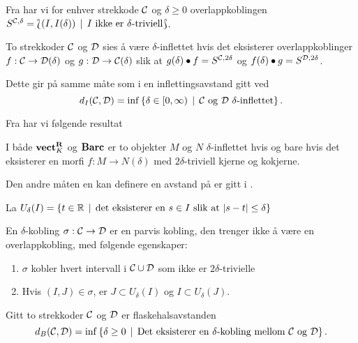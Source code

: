 Fra \cite{Bauer2020} har vi for enhver strekkode $\mathcal{C}$
og $\delta\geq0$ overlappkoblingen $S^{\mathcal{C},\delta}
= \Lbag (I,I(\delta))\,\mid\, \text{$I$ ikke er
$\delta$-triviell}\Rbag$.

\begin{definisjon}\label{def:InfBar}
To strekkoder $\mathcal{C}$ og $\mathcal{D}$ sies å være
  $\delta$-inflettet hvis det eksisterer overlappkoblinger
  $f:\mathcal{C}\to \mathcal{D}(\delta)$ og $g:\mathcal{D}\to\mathcal{C}(\delta)$
  slik at $g(\delta)\bullet f = S^{\mathcal{C},2\delta}$ og
  $f(\delta)\bullet g=S^{\mathcal{D},2\delta}$.
\end{definisjon}

Dette gir på samme måte som i  en inflettingsavstand gitt ved
\[d_I(\mathcal{C},\mathcal{D}) = \inf\left\{\delta\in[0,\infty)\,\mid\,\text{$\mathcal{C}$ og $\mathcal{D}$ $\delta$-inflettet}\right\}.\]

Fra \citep[proposisjon 4.2]{Bauer2020} har vi følgende resultat
\begin{proposisjon}\label{prop:inftriv}
  I både $\textnormal{\textbf{vect}}_K^{\textnormal{\textbf{{R}}}}$ og $\textnormal{\textbf{Barc}}$ er to objekter $M$ og $N$ $\delta$-inflettet hvis og bare hvis det eksisterer en morfi $f: M\to N(\delta)$ med $2\delta$-triviell kjerne og kokjerne.
\end{proposisjon}

Den andre måten en kan definere en avstand på er gitt
i \cite[seksjon 4.2]{Bauer2020}.

La $U_\delta(I) = \left\{t\in\mathbb{R}\,\mid\,\text{det eksisterer en $s\in I$ slik at }|s-t|\leq\delta\right\}$

\begin{definisjon}\label{def:delta-kobling}
En $\delta$-kobling $\sigma:\mathcal{C}\to \mathcal{D}$ er en parvis kobling, den trenger ikke å være en overlappkobling, med følgende egenskaper:
\begin{enumerate}
    \item $\sigma$ kobler hvert intervall i $\mathcal{C}\cup\mathcal{D}$ som ikke er $2\delta$-trivielle\\
    \item Hvis $(I,J)\in\sigma$, er $J\subset U_\delta(I)$ og $I\subset U_\delta(J)$.
\end{enumerate}
\end{definisjon}

\begin{definisjon}\label{def:FlaskAvst}
Gitt to strekkoder $\mathcal{C}$ og $\mathcal{D}$ er flaskehalsavstanden
\[d_B(\mathcal{C},\mathcal{D}) = \inf\left\{\delta\geq 0\,\mid\,\text{Det eksisterer en $\delta$-kobling mellom $\mathcal{C}$ og $\mathcal{D}$}\right\}.\]
\end{definisjon}


